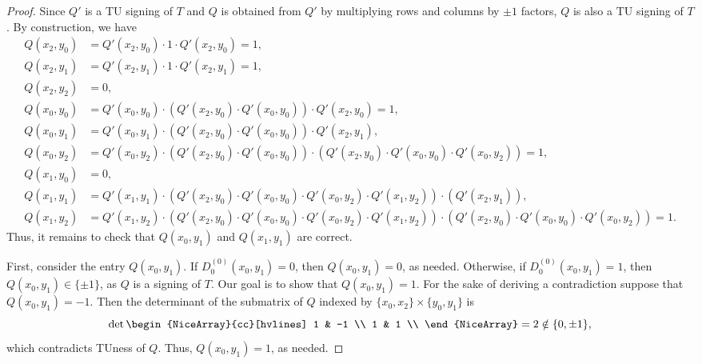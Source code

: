 \begin{proof}
    Since $Q'$ is a TU signing of $T$ and $Q$ is obtained from $Q'$ by multiplying rows and columns by $\pm 1$ factors, $Q$ is also a TU signing of $T$. By construction, we have
    \begin{align*}
        Q (x_{2}, y_{0}) &= Q' (x_{2}, y_{0}) \cdot 1 \cdot Q' (x_{2}, y_{0}) = 1, \\
        Q (x_{2}, y_{1}) &= Q' (x_{2}, y_{1}) \cdot 1 \cdot Q' (x_{2}, y_{1}) = 1, \\
        Q (x_{2}, y_{2}) &= 0, \\
        Q (x_{0}, y_{0}) &= Q' (x_{0}, y_{0}) \cdot (Q' (x_{2}, y_{0}) \cdot Q' (x_{0}, y_{0})) \cdot Q' (x_{2}, y_{0}) = 1, \\
        Q (x_{0}, y_{1}) &= Q' (x_{0}, y_{1}) \cdot (Q' (x_{2}, y_{0}) \cdot Q' (x_{0}, y_{0})) \cdot Q' (x_{2}, y_{1}), \\
        Q (x_{0}, y_{2}) &= Q' (x_{0}, y_{2}) \cdot (Q' (x_{2}, y_{0}) \cdot Q' (x_{0}, y_{0})) \cdot (Q' (x_{2}, y_{0}) \cdot Q' (x_{0}, y_{0}) \cdot Q' (x_{0}, y_{2})) = 1, \\
        Q (x_{1}, y_{0}) &= 0, \\
        Q (x_{1}, y_{1}) &= Q' (x_{1}, y_{1}) \cdot (Q' (x_{2}, y_{0}) \cdot Q' (x_{0}, y_{0}) \cdot Q' (x_{0}, y_{2}) \cdot Q' (x_{1}, y_{2})) \cdot (Q' (x_{2}, y_{1})), \\
        Q (x_{1}, y_{2}) &= Q' (x_{1}, y_{2}) \cdot (Q' (x_{2}, y_{0}) \cdot Q' (x_{0}, y_{0}) \cdot Q' (x_{0}, y_{2}) \cdot Q' (x_{1}, y_{2})) \cdot (Q' (x_{2}, y_{0}) \cdot Q' (x_{0}, y_{0}) \cdot Q' (x_{0}, y_{2})) = 1.
    \end{align*}
    Thus, it remains to check that $Q (x_{0}, y_{1})$ and $Q (x_{1}, y_{1})$ are correct.

    First, consider the entry $Q (x_{0}, y_{1})$. If $D_{0}^{(0)} (x_{0}, y_{1}) = 0$, then $Q (x_{0}, y_{1}) = 0$, as needed. Otherwise, if $D_{0}^{(0)} (x_{0}, y_{1}) = 1$, then $Q (x_{0}, y_{1}) \in \{\pm 1\}$, as $Q$ is a signing of $T$. Our goal is to show that $Q (x_{0}, y_{1}) = 1$. For the sake of deriving a contradiction suppose that $Q (x_{0}, y_{1}) = -1$. Then the determinant of the submatrix of $Q$ indexed by $\{x_{0}, x_{2}\} \times \{y_{0}, y_{1}\}$ is
    \[
        \det \begin{NiceArray}{cc}[hvlines] 1 & -1 \\ 1 & 1 \\ \end{NiceArray} = 2 \notin \{0, \pm 1\},
    \]
    which contradicts TUness of $Q$. Thus, $Q (x_{0}, y_{1}) = 1$, as needed.


\end{proof}
